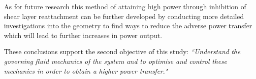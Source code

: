  As for future research this method of attaining high power through inhibition of shear layer reattachment can be further developed by conducting more detailed investigations into the geometry to find ways to reduce the adverse power transfer which will lead to further increases in power output.
 
These conclusions support the second objective of this study: \emph{ ``Understand the governing fluid mechanics of the system and to optimise and control these mechanics in order to obtain a higher power transfer."} 
 
 
 